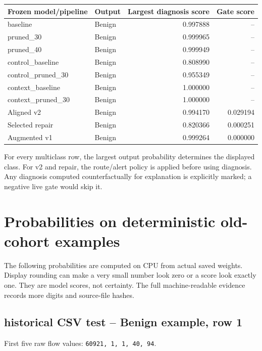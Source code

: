 \documentclass[11pt,a4paper,oneside]{report}
\newcommand{\code}[1]{\nolinkurl{#1}}
\begin{document}
{\small
\begin{longtable}{@{}p{}lrr@{}}
\toprule
Frozen model/pipeline & Output & Largest diagnosis score & Gate score\\\midrule\endhead
baseline & Benign & 0.997888 & --\\
pruned\_30 & Benign & 0.999965 & --\\
pruned\_40 & Benign & 0.999949 & --\\
control\_baseline & Benign & 0.808990 & --\\
control\_pruned\_30 & Benign & 0.955349 & --\\
context\_baseline & Benign & 1.000000 & --\\
context\_pruned\_30 & Benign & 1.000000 & --\\
Aligned v2 & Benign & 0.994170 & 0.029194\\
Selected repair & Benign & 0.820366 & 0.000251\\
Augmented v1 & Benign & 0.999264 & 0.000000\\
\bottomrule\end{longtable}
}

For every multiclass row, the largest output probability determines the displayed class. For v2 and repair, the route/alert policy is applied before using diagnosis. Any diagnosis computed counterfactually for explanation is explicitly marked; a negative live gate would skip it.

\section{Probabilities on deterministic old-cohort examples}
The following probabilities are computed on CPU from actual saved weights. Display rounding can make a very small number look zero or a score look exactly one. They are model scores, not certainty. The full machine-readable evidence records more digits and source-file hashes.
\subsection{historical CSV test -- Benign example, row 1}
First five raw flow values: \code{60921, 1, 1, 40, 94}.
\end{document}
